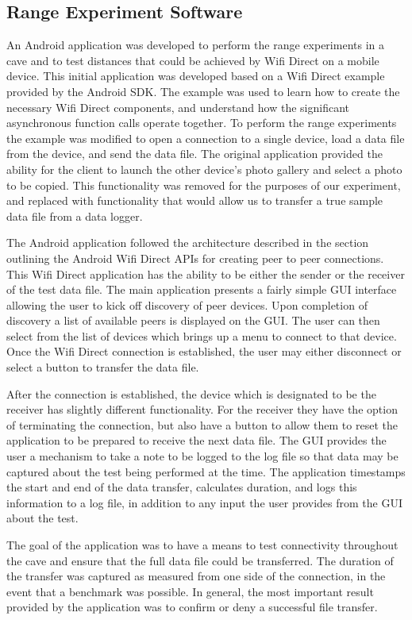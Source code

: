 \documentclass[10pt,twocolumn]{article}
\begin{document}
\subsection{Range Experiment Software}
An Android application was developed to perform the range experiments in a cave and to test distances that could be achieved by Wifi Direct on a mobile device.
This initial application was developed based on a Wifi Direct example provided by the Android SDK.
The example was used to learn how to create the necessary Wifi Direct components, and understand how the significant asynchronous function calls operate together.
To perform the range experiments the example was modified to open a connection to a single device, load a data file from the device, and send the data file. 
The original application provided the ability for the client to launch the other device's photo gallery and select a photo to be copied.
This functionality was removed for the purposes of our experiment, and replaced with functionality that would allow us to transfer a true sample data file from a data logger.

The Android application followed the architecture described in the section outlining the Android Wifi Direct APIs for creating peer to peer connections. 
This Wifi Direct application has the ability to be either the sender or the receiver of the test data file.
The main application presents a fairly simple GUI interface allowing the user to kick off discovery of peer devices. 
Upon completion of discovery a list of available peers is displayed on the GUI.
The user can then select from the list of devices which brings up a menu to connect to that device.
Once the Wifi Direct connection is established, the user may either disconnect or select a button to transfer the data file.

After the connection is established, the device which is designated to be the receiver has slightly different functionality.
For the receiver they have the option of terminating the connection, but also have a button to allow them to reset the application to be prepared to receive the next data file.
The GUI provides the user a mechanism to take a note to be logged to the log file so that data may be captured about the test being performed at the time.
The application timestamps the start and end of the data transfer, calculates duration, and logs this information to a log file, in addition to any input the user provides from the GUI about the test.

The goal of the application was to have a means to test connectivity throughout the cave and ensure that the full data file could be transferred.
The duration of the transfer was captured as measured from one side of the connection, in the event that a benchmark was possible.
In general, the most important result provided by the application was to confirm or deny a successful file transfer.
\end{document}
